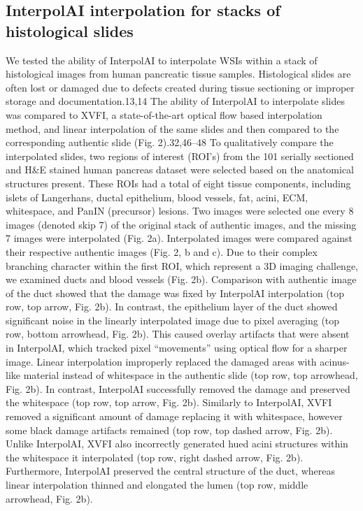 \begin{refsection}
    \section{InterpolAI interpolation for stacks of histological slides}
    We tested the ability of InterpolAI to interpolate WSIs within a stack of histological images from human pancreatic tissue samples. Histological slides are often lost or damaged due to defects created during tissue sectioning or improper storage and documentation.13,14 The ability of InterpolAI to interpolate slides was compared to XVFI, a state-of-the-art optical flow based interpolation method, and linear interpolation of the same slides and then compared to the corresponding authentic slide (Fig. 2).32,46–48 To qualitatively compare the interpolated slides, two regions of interest (ROI’s) from the 101 serially sectioned and H&E stained human pancreas dataset were selected based on the anatomical structures present. These ROIs had a total of eight tissue components, including islets of Langerhans, ductal epithelium, blood vessels, fat, acini, ECM, whitespace, and PanIN (precursor) lesions. Two images were selected one every 8 images (denoted skip 7) of the original stack of authentic images, and the missing 7 images were interpolated (Fig. 2a). Interpolated images were compared against their respective authentic images (Fig. 2, b and c).
    Due to their complex branching character within the first ROI, which represent a 3D imaging challenge, we examined ducts and blood vessels (Fig. 2b). Comparison with authentic image of the duct showed that the damage was fixed by InterpolAI interpolation (top row, top arrow, Fig. 2b). In contrast, the epithelium layer of the duct showed significant noise in the linearly interpolated image due to pixel averaging (top row, bottom arrowhead, Fig. 2b). This caused overlay artifacts that were absent in InterpolAI, which tracked pixel “movements” using optical flow for a sharper image. Linear interpolation improperly replaced the damaged areas with acinus-like material instead of whitespace in the authentic slide (top row, top arrowhead, Fig. 2b). In contrast, InterpolAI successfully removed the damage and preserved the whitespace (top row, top arrow, Fig. 2b). Similarly to InterpolAI, XVFI removed a significant amount of damage replacing it with whitespace, however some black damage artifacts remained (top row, top dashed arrow, Fig. 2b). Unlike InterpolAI, XVFI also incorrectly generated hued acini structures within the whitespace it interpolated (top row, right dashed arrow, Fig. 2b). Furthermore, InterpolAI preserved the central structure of the duct, whereas linear interpolation thinned and elongated the lumen (top row, middle arrowhead, Fig. 2b). 

\end{refsection}
